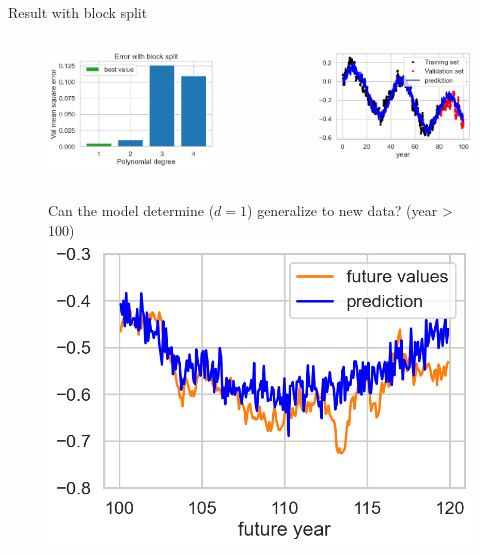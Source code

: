 \documentclass[handout, 10pt]{beamer}
\begin{document}
\begin{frame}{Result with block split}
\begin{columns}
   \begin{figure}
    \includegraphics[width=.9\textwidth]{presentation/course-2/figs/leak_bar_block.png}
    \end{figure}
    
   \begin{figure}
    \includegraphics[width=.9\textwidth]{presentation/course-2/figs/leak_ts_block.png}
    \end{figure}
\end{columns}

   \begin{figure}
   \centering
   Can the model determine ($d=1$) generalize to new data? (year > 100)\\
   \pause
    \includegraphics[width=.5\textwidth]{presentation/course-2/figs/leak_test_block.png}
    \end{figure}
\end{frame}
\end{document}
